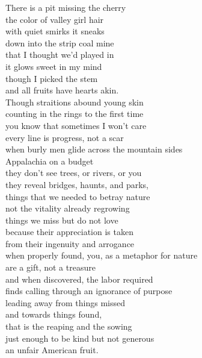 There is a pit missing the cherry\\
the color of valley girl hair\\
with quiet smirks it sneaks\\
down into the strip coal mine\\
that I thought we'd played in\\
it glows sweet in my mind\\
though I picked the stem\\
and all fruits have hearts akin.\\
\newline
Though straitions abound young skin\\
counting in the rings to the first time\\
you know that sometimes I won't care\\
every line is progress, not a scar\\
when burly men glide across the mountain sides\\
Appalachia on a budget\\
they don't see trees, or rivers, or you\\
they reveal bridges, haunts, and parks,\\
things that we needed to betray nature\\
not the vitality already regrowing\\
things we miss but do not love\\
\newline
because their appreciation is taken\\
from their ingenuity and arrogance\\
when properly found, you, as a metaphor for nature\\
are a gift, not a treasure\\
and when discovered, the labor required\\
finds calling through an ignorance of purpose\\
leading away from things missed\\
and towards things found,\\
that is the reaping and the sowing\\
just enough to be kind but not generous\\
an unfair American fruit.\\

